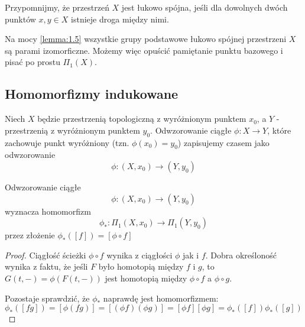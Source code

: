 Przypomnijmy, że przestrzeń $X$ jest łukowo spójna, jeśli dla dowolnych dwóch punktów $x, y\in X$ istnieje droga między nimi.

\begin{uwaga}
  Na mocy \ref{lemma:1.5} wszystkie grupy podstawowe łukowo spójnej przestrzeni $X$ są parami izomorficzne. Możemy więc opuścić pamiętanie punktu bazowego i pisać po prostu $\Pi_1(X)$.
\end{uwaga}

\subsection{Homomorfizmy indukowane}

Niech $X$ będzie przestrzenią topologiczną z wyróżnionym punktem $x_0$, a $Y$ - przestrzenią z wyróżnionym punktem $y_0$. Odwzorowanie ciągłe $\phi:X\to Y$, które zachowuje punkt wyróżniony (tzn. $\phi(x_0)=y_0$) zapisujemy czasem jako odwzorowanie 
$$\phi:(X, x_0)\to (Y, y_0)$$

\begin{fact}
  Odwzorowanie ciągłe
  $$\phi:(X, x_0)\to (Y, y_0)$$
  wyznacza homomorfizm 
  $$\phi_*:\Pi_1(X, x_0)\to \Pi_1(Y, y_0)$$
  przez złożenie $\phi_*([f])=[\phi\circ f]$
\end{fact}

\begin{proof}
  Ciągłość ścieżki $\phi\circ f$ wynika z ciągłości $\phi$ jak i $f$. Dobra określoność wynika z faktu, że jeśli $F$ było homotopią między $f$ i $g$, to $G(t, -)=\phi(F(t, -))$ jest homotopią między $\phi\circ f$ a $\phi\circ g$.

  Pozostaje sprawdzić, że $\phi_*$ naprawdę jest homomorfizmem: 
  $$\phi_*([fg])=[\phi(fg)]=[(\phi f)(\phi g)]=[\phi f][\phi g]=\phi_*([f])\phi_*([g])$$
\end{proof}



